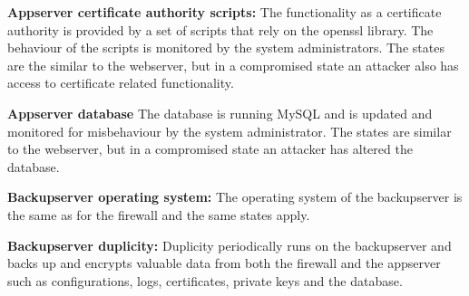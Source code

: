 \documentclass[english]{article}
\begin{document}
\begin{description}
		\item{\textbf{Appserver certificate authority scripts:}} The functionality as a certificate authority is provided by a set of scripts that rely on the openssl library. The behaviour of the scripts is monitored by the system administrators. The states are the similar to the webserver, but in a compromised state an attacker also has access to certificate related functionality.
		\item{\textbf{Appserver database}} The database is running MySQL and is updated and monitored for misbehaviour by the system administrator. The states are similar to the webserver, but in a compromised state an attacker has altered the database.
		\item{\textbf{Backupserver operating system:}} The operating system of the backupserver is the same as for the firewall and the same states apply.
		\item{\textbf{Backupserver duplicity:}} Duplicity periodically runs on the backupserver and backs up and encrypts valuable data from both the firewall and the appserver such as configurations, logs, certificates, private keys and the database.
	\end{description}
\end{document}
